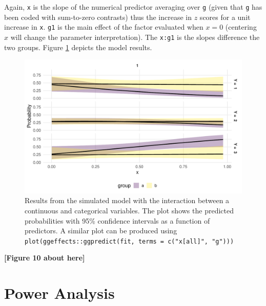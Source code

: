 \documentclass[
  man,floatsintext]{apa6}
\begin{document}
\normalsize

Again, \texttt{x} is the slope of the numerical predictor averaging over \texttt{g} (given that \texttt{g} has been coded with sum-to-zero contrasts) thus the increase in \(z\) scores for a unit increase in \texttt{x}. \texttt{g1} is the main effect of the factor evaluated when \(x = 0\) (centering \(x\) will change the parameter interpretation). The \texttt{x:g1} is the slopes difference the two groups. Figure \ref{fig:fig-effects-num-by-cat-interaction} depicts the model results.

\scriptsize

\begin{figure}

{\centering \includegraphics[width=1\linewidth]{paper_files/figure-latex/fig-effects-num-by-cat-interaction-1} 

}

\caption{Results from the simulated model with the interaction between a continuous and categorical variables. The plot shows the predicted probabilities with 95\% confidence intervals as a function of predictors. A similar plot can be produced using \texttt{plot(ggeffects::ggpredict(fit,\ terms\ =\ c("x{[}all{]}",\ "g")))}}\label{fig:fig-effects-num-by-cat-interaction}
\end{figure}

\begin{center}\textbf{[Figure 10 about here]} \end{center}

\normalsize

\section{Power Analysis}\label{power-analysis}
\end{document}
